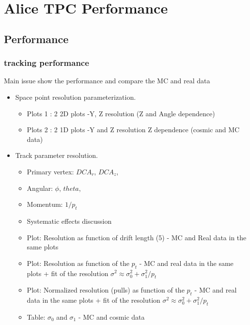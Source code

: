 \documentclass{elsart}
\begin{document}
\section{ Alice TPC Performance}




\subsection{Performance}

\subsubsection{tracking performance}

Main issue show the performance and compare the MC and real data
\begin{itemize} 
\item Space point resolution parameterization.
      \begin{itemize} 	
      \item Plots 1 : 2 2D plots -Y, Z resolution (Z and Angle dependence)
      \item Plots 2 : 2 1D plots -Y and Z resolution Z dependence (cosmic and MC data)  
      \end{itemize}
\item Track parameter resolution. 
      \begin{itemize} 	
      \item Primary vertex: $DCA_r$, $DCA_z$, 
      \item Angular:        $\phi$, $theta$, 
      \item Momentum:       $1/p_{t}$
      \item Systematic effects discussion	
      \end{itemize}	
      \begin{itemize} 	
      \item  Plot: Resolution as function of drift length (5) - MC and Real data in the same plots
      \item  Plot: Resolution as function of the $p_t$        - MC and real data in the same plots
 	     + fit of the resolution  $\sigma^2 \approx \sigma^2_0+\sigma^2_1/p_{t}$
      \item  Plot: Normalized resolution (pulls) as function of the $p_t$        - MC and real data in the same plots
 	     + fit of the resolution  $\sigma^2 \approx \sigma^2_0+\sigma^2_1/p_{t}$
      \item Table: $\sigma_0$ and $\sigma_1$ -  MC and cosmic data       	
      \end{itemize}	
\end{itemize}
\end{document}
